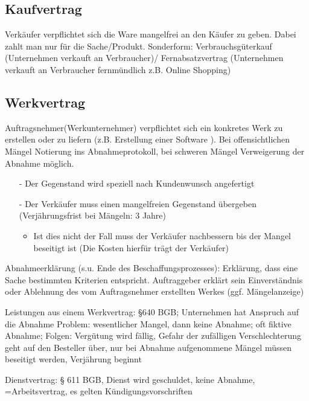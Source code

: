 \documentclass[asp1.tex]{subfiles}
\begin{document}
\subsection{Kaufvertrag}
Verkäufer verpflichtet sich die Ware mangelfrei an den Käufer zu geben. Dabei zahlt man nur für die Sache/Produkt.
Sonderform: Verbrauchsgüterkauf (Unternehmen verkauft an Verbraucher)/
Fernabsatzvertrag (Unternehmen verkauft an Verbraucher fernmündlich z.B. Online Shopping)

\subsection{Werkvertrag}
Auftragsnehmer(Werkunternehmer) verpflichtet sich ein konkretes Werk zu erstellen oder zu liefern  (z.B. Erstellung einer Software ). Bei offensichtlichen Mängel \textrightarrow\space Notierung ins Abnahmeprotokoll, bei schweren Mängel \textrightarrow\space Verweigerung der Abnahme möglich.

\begin{itemize}
    \item[-] Der Gegenstand wird speziell nach Kundenwunsch angefertigt
    \item[-]Der Verkäufer muss einen mangelfreien Gegenstand übergeben (Verjährungsfrist bei Mängeln: 3 Jahre)
          \begin{itemize}
              \item Ist dies nicht der Fall muss der Verkäufer nachbessern bis der Mangel beseitigt ist (Die Kosten hierfür trägt der Verkäufer)
          \end{itemize}

\end{itemize}

Abnahmeerklärung (s.u. Ende des Beschaffungsprozesses): Erklärung, dass eine Sache bestimmten Kriterien entspricht. Auftraggeber erklärt sein Einverständnis oder Ablehnung des vom Auftragsnehmer erstellten Werkes (ggf. Mängelanzeige)

Leistungen aus einem Werkvertrag: §640 BGB; Unternehmen hat Anspruch auf die Abnahme
Problem: wesentlicher Mangel, dann keine Abnahme; oft fiktive Abnahme; Folgen: Vergütung wird fällig, Gefahr der zufälligen Verschlechterung geht auf den Besteller über, nur bei Abnahme aufgenommene Mängel müssen beseitigt werden, Verjährung beginnt

Dienstvertrag: § 611 BGB, Dienst wird geschuldet, keine Abnahme, =Arbeitsvertrag, es gelten Kündigungsvorschriften
\end{document}
